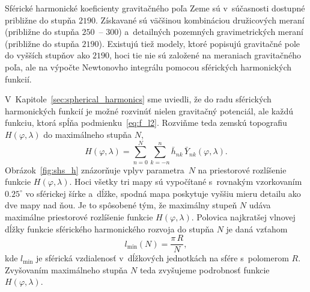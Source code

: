 \documentclass[a4paper,12pt]{book}
\begin{document}
Sférické harmonické koeficienty gravitačného poľa Zeme sú v~súčasnosti dostupné
približne do stupňa $2190$.  Získavané sú väčšinou kombináciou družicových
meraní (približne do stupňa $250$~-- $300$) a~detailných pozemných
gravimetrických meraní (približne do stupňa $2190$).  Existujú tiež modely,
ktoré popisujú gravitačné pole do vyšších stupňov ako $2190$, hoci tie nie sú
založené na meraniach gravitačného poľa, ale na výpočte Newtonovho integrálu
pomocou sférických harmonických funkcií.

V~Kapitole~\ref{sec:spherical_harmonics} sme uviedli, že do radu sférických
harmonických funkcií je možné rozvinúť nielen gravitačný potenciál, ale každú
funkciu, ktorá spĺňa podmienku~\ref{eq:f_l2}.  Rozviňme teda zemskú topografiu
$H(\varphi, \lambda)$ do maximálneho stupňa $N$,
%
\begin{equation}
\label{eq:h_shs}
H(\varphi, \lambda) = \sum_{n = 0}^{N} \sum_{k = -n}^n \bar{h}_{nk} \,
\bar{Y}_{nk}(\varphi, \lambda){.}
\end{equation}
%
Obrázok~\ref{fig:shs_h} znázorňuje vplyv parametra~$N$ na priestorové
rozlíšenie funkcie $H(\varphi, \lambda)$.  Hoci všetky tri mapy sú vypočítané
s~rovnakým vzorkovaním $0.25^{\circ}$ vo sférickej šírke a~dĺžke, spodná mapa
poskytuje vyššiu mieru detailu ako dve mapy nad ňou.  Je to spôsobené tým, že
maximálny stupeň $N$ udáva maximálne priestorové rozlíšenie funkcie
$H(\varphi,\lambda)$.  Polovica najkratšej vlnovej dĺžky funkcie sférického
harmonického rozvoja do stupňa $N$ je daná vzťahom
%
\begin{equation}
l_{\min}(N) = \frac{\pi \, R}{N}{,}
\end{equation}
%
kde $l_{\min}$ je sférická vzdialenosť v~dĺžkových jednotkách na sfére 
s~polomerom $R$.  Zvyšovaním
maximálneho stupňa $N$ teda zvyšujeme podrobnosť funkcie $H(\varphi, \lambda)$.
\end{document}
